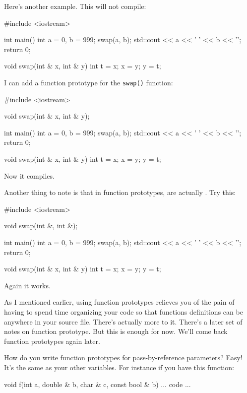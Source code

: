 Here's another example. This will not compile:

\begin{consolethree}[escapeinside=||]
#include <iostream>

int main()
{
    int a = 0, b = 999;
    swap(a, b);
    std::cout << a << ' ' << b << '\n';
    return 0;
}

void swap(int & x, int & y)
{
    int t = x;
    x = y;
    y = t;
}
\end{consolethree}

I can add a function prototype for the \texttt{swap()} function:

\begin{consolethree}[escapeinside=||]
#include <iostream>

void swap(int & x, int & y);

int main()
{
    int a = 0, b = 999;
    swap(a, b);
    std::cout << a << ' ' << b << '\n';
    return 0;
}

void swap(int & x, int & y)
{
    int t = x;
    x = y;
    y = t;
}
\end{consolethree}

Now it compiles.

Another thing to note is that in function prototypes,  are actually . Try this:

\begin{consolethree}[escapeinside=||]
#include <iostream>

void swap(int &, int &);

int main()
{
    int a = 0, b = 999;
    swap(a, b);
    std::cout << a << ' ' << b << '\n';
    return 0;
}

void swap(int & x, int & y)
{
    int t = x;
    x = y;
    y = t;
}
\end{consolethree}

Again it works.

As I mentioned earlier, using function prototypes relieves you of the
pain of having to spend time organizing your code so that functions
definitions can be anywhere in your source file. There's actually more
to it. There's a later set of notes on function prototype. But this is
enough for now. We'll come back function prototypes again later.

How do you write function prototypes for pass-by-reference parameters?
Easy! It's the same as your other variables. For
instance if you have this function:

\begin{consolethree}[escapeinside=||]
void f(int a, double & b, char & c, const bool & b)
{
    ... code ...
}
\end{consolethree}

